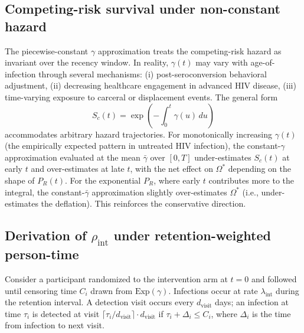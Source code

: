 \documentclass[11pt]{article}
\begin{document}
\subsection{Competing-risk survival under non-constant hazard}

The piecewise-constant $\gamma$ approximation treats the competing-risk hazard as invariant over the recency window. In reality, $\gamma(t)$ may vary with age-of-infection through several mechanisms: (i) post-seroconversion behavioral adjustment, (ii) decreasing healthcare engagement in advanced HIV disease, (iii) time-varying exposure to carceral or displacement events. The general form
\begin{equation}
S_c(t) = \exp\!\left(-\int_0^t \gamma(u)\,du\right)
\end{equation}
accommodates arbitrary hazard trajectories. For monotonically increasing $\gamma(t)$ (the empirically expected pattern in untreated HIV infection), the constant-$\gamma$ approximation evaluated at the mean $\bar\gamma$ over $[0, T]$ under-estimates $S_c(t)$ at early $t$ and over-estimates at late $t$, with the net effect on $\Omega^*$ depending on the shape of $P_R(t)$. For the exponential $P_R$, where early $t$ contributes more to the integral, the constant-$\bar\gamma$ approximation slightly over-estimates $\Omega^*$ (i.e., under-estimates the deflation). This reinforces the conservative direction.

\subsection{Derivation of $\rho_{\mathrm{int}}$ under retention-weighted person-time}

Consider a participant randomized to the intervention arm at $t=0$ and followed until censoring time $C_i$ drawn from $\mathrm{Exp}(\gamma)$. Infections occur at rate $\lambda_{\mathrm{int}}$ during the retention interval. A detection visit occurs every $d_{\mathrm{visit}}$ days; an infection at time $\tau_i$ is detected at visit $\lceil \tau_i / d_{\mathrm{visit}} \rceil \cdot d_{\mathrm{visit}}$ if $\tau_i + \Delta_i \leq C_i$, where $\Delta_i$ is the time from infection to next visit.
\end{document}
